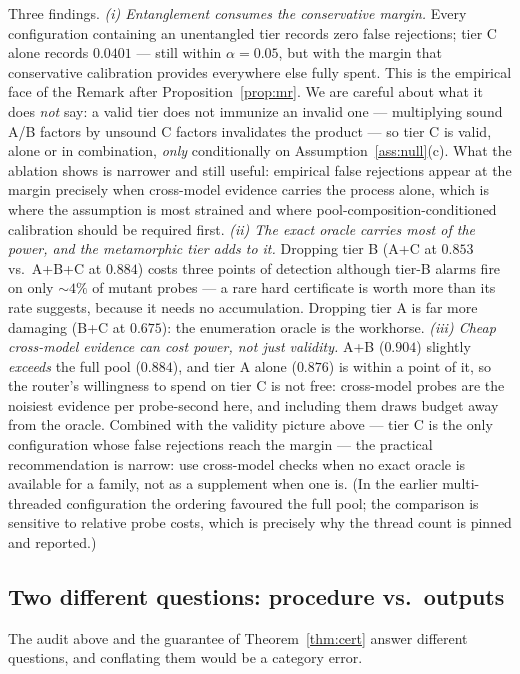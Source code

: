 \documentclass[pdflatex,sn-mathphys-num]{sn-jnl}
\theoremstyle{thmstyleone}
\theoremstyle{thmstyletwo}
\begin{document}
Three findings. \emph{(i) Entanglement consumes the conservative
margin.} Every configuration containing an unentangled tier records
zero false rejections; tier C alone records $0.0401$ --- still within
$\alpha = 0.05$, but with the margin that conservative calibration
provides everywhere else fully spent. This is the empirical face of
the Remark after Proposition~\ref{prop:mr}. We are careful about what
it does \emph{not} say: a valid tier does not immunize an invalid one
--- multiplying sound A/B factors by unsound C factors invalidates
the product --- so tier C is valid, alone or in combination,
\emph{only} conditionally on Assumption~\ref{ass:null}(c). What the
ablation shows is narrower and still useful: empirical false
rejections appear at the margin precisely when cross-model evidence
carries the process alone, which is where the assumption is most
strained and where pool-composition-conditioned calibration should be
required first.
\emph{(ii) The exact oracle carries most of the power, and the
metamorphic tier adds to it.} Dropping tier B (A+C at $0.853$ vs.\
A+B+C at $0.884$) costs three points of detection although tier-B
alarms fire on only ${\sim}4\%$ of mutant probes --- a rare hard
certificate is worth more than its rate suggests, because it needs no
accumulation. Dropping tier A is far more damaging (B+C at $0.675$):
the enumeration oracle is the workhorse.
\emph{(iii) Cheap cross-model evidence can cost power, not just
validity.} A+B ($0.904$) slightly \emph{exceeds} the full pool
($0.884$), and tier A alone ($0.876$) is within a point of it, so the
router's willingness to spend on tier C is not free: cross-model
probes are the noisiest evidence per probe-second here, and including
them draws budget away from the oracle. Combined with the validity
picture above --- tier C is the only configuration whose false
rejections reach the margin --- the practical recommendation is
narrow: use cross-model checks when no exact oracle is available for a
family, not as a supplement when one is. (In the earlier
multi-threaded configuration the ordering favoured the full pool; the
comparison is sensitive to relative probe costs, which is precisely
why the thread count is pinned and reported.)

\subsection{Two different questions: procedure vs.\ outputs}
\label{sec:validation}

The audit above and the guarantee of Theorem~\ref{thm:cert} answer
different questions, and conflating them would be a category error.
\end{document}
